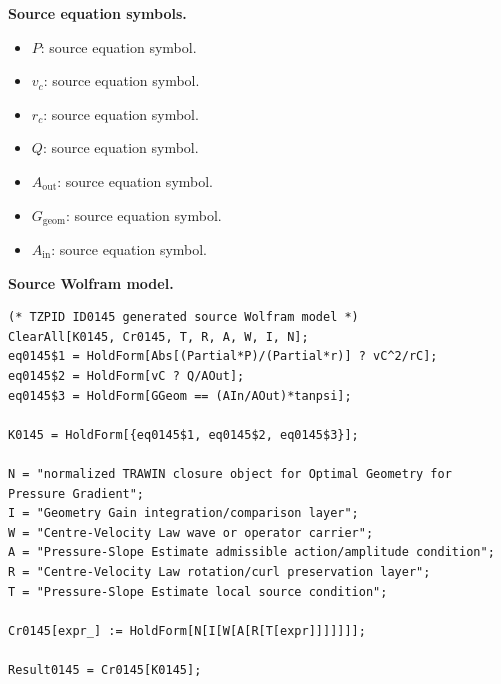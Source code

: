 \begin{minipage}[t]{0.49\linewidth}
\begingroup
\small
\raggedright
\textbf{Source equation symbols.}\par
\begin{itemize}[leftmargin=1.35em,itemsep=1pt,topsep=1pt,parsep=0pt]
    \item $P$: source equation symbol.
    \item $v_c$: source equation symbol.
    \item $r_c$: source equation symbol.
    \item $Q$: source equation symbol.
    \item $A_{\mathrm{out}}$: source equation symbol.
    \item $G_{\mathrm{geom}}$: source equation symbol.
    \item $A_{\mathrm{in}}$: source equation symbol.
\end{itemize}
\endgroup
\end{minipage}\hfill
\begin{minipage}[t]{0.47\linewidth}
\begingroup
\scriptsize
\raggedright
\textbf{Source Wolfram model.}\par
\begin{Verbatim}[fontsize=\tiny,breaklines=true,breakanywhere=true]
(* TZPID ID0145 generated source Wolfram model *)
ClearAll[K0145, Cr0145, T, R, A, W, I, N];
eq0145$1 = HoldForm[Abs[(Partial*P)/(Partial*r)] ? vC^2/rC];
eq0145$2 = HoldForm[vC ? Q/AOut];
eq0145$3 = HoldForm[GGeom == (AIn/AOut)*tanpsi];

K0145 = HoldForm[{eq0145$1, eq0145$2, eq0145$3}];

N = "normalized TRAWIN closure object for Optimal Geometry for Pressure Gradient";
I = "Geometry Gain integration/comparison layer";
W = "Centre-Velocity Law wave or operator carrier";
A = "Pressure-Slope Estimate admissible action/amplitude condition";
R = "Centre-Velocity Law rotation/curl preservation layer";
T = "Pressure-Slope Estimate local source condition";

Cr0145[expr_] := HoldForm[N[I[W[A[R[T[expr]]]]]]];

Result0145 = Cr0145[K0145];
\end{Verbatim}
\endgroup
\end{minipage}

